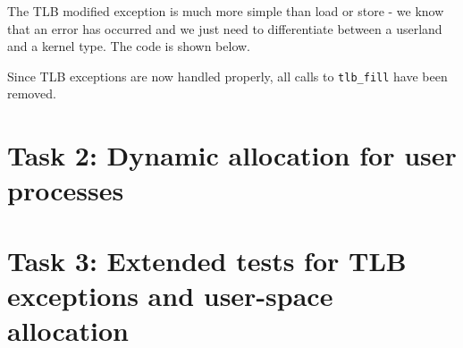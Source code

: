 \documentclass[a4paper,12pt]{article}
\begin{document}
The TLB modified exception is much more simple than load or store - we know that an error has occurred and we just need to differentiate between a userland and a kernel type. The code is shown below. 


Since TLB exceptions are now handled properly, all calls to \texttt{tlb\_fill} have been removed.

\section{Task 2: Dynamic allocation for user processes}

\section{Task 3: Extended tests for TLB exceptions and user-space allocation}
\end{document}
